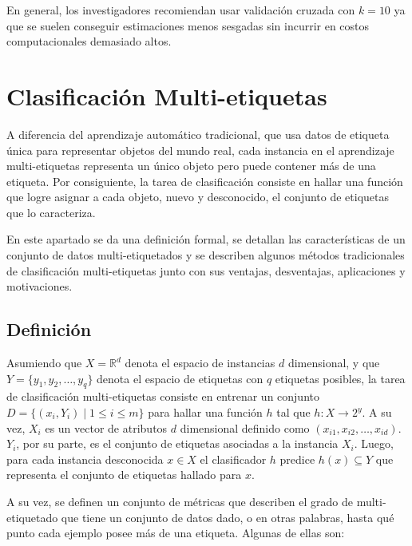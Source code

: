 En general, los investigadores recomiendan usar validación cruzada con $k=10$ ya
que se suelen conseguir estimaciones menos sesgadas sin incurrir en costos
computacionales demasiado altos.

\section{Clasificación Multi-etiquetas}

A diferencia del aprendizaje automático tradicional, que usa datos de etiqueta
única para representar objetos del mundo real, cada instancia en el aprendizaje
multi-etiquetas representa un único objeto pero puede contener más de una
etiqueta. Por consiguiente, la tarea de clasificación consiste en hallar una
función que logre asignar a cada objeto, nuevo y desconocido, el conjunto de
etiquetas que lo caracteriza.

En este apartado se da una definición formal, se detallan las características de
un conjunto de datos multi-etiquetados y se  describen algunos métodos
tradicionales de clasificación multi-etiquetas junto con sus ventajas,
desventajas, aplicaciones y motivaciones.

\subsection{Definición}
\label{mll_def_formal}

Asumiendo que $X=\mathbb{R}^{d}$ denota el espacio de instancias $d$
dimensional, y que $Y = \{y_{1}, y_{2}, \dots, y_{q}\}$ denota el espacio de
etiquetas con $q$ etiquetas posibles, la tarea de clasificación multi-etiquetas
consiste en entrenar un conjunto $D = \{(x_{i}, Y_{i}) \mid 1 \leq i \leq m\}$
para hallar una función $h$ tal que $h: X \rightarrow 2^y$. A su vez, $X_{i}$ es
un vector de atributos $d$ dimensional definido como $(x_{i1}, x_{i2}, \dots,
	x_{id})$. $Y_{i}$, por su parte, es el conjunto de etiquetas asociadas a la
instancia $X_{i}$. Luego, para cada instancia desconocida $x \in X$ el
clasificador $h$ predice $h(x) \subseteq Y$ que representa el conjunto de
etiquetas hallado para $x$.

A su vez, se definen un conjunto de métricas que describen el grado de
multi-etiquetado que tiene un conjunto de datos dado, o en otras palabras, hasta
qué punto cada ejemplo posee más de una etiqueta. Algunas de ellas son:


